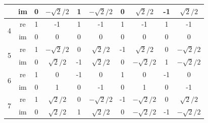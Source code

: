 \begin{center}
\begin{tabular}{| c c c c c c c c c c |}
		                           & im                           & 0                            & $-\sqrt{2}/2$                & 1                            & $-\sqrt{2}/2$                & 0                            & $\sqrt{2}/2$                 & -1                            & $\sqrt{2}/2$  \\
		\hline\hline
		\multirow{2}{*}{4}         & re                           & 1                            & -1                           & 1                            & -1                           & 1                            & -1                           & 1                             & -1            \\
		                           & im                           & 0                            & 0                            & 0                            & 0                            & 0                            & 0                            & 0                             & 0             \\
		\hline\hline
		\multirow{2}{*}{5}         & re                           & 1                            & $-\sqrt{2}/2$                & 0                            & $\sqrt{2}/2$                 & -1                           & $\sqrt{2}/2$                 & 0                             & $-\sqrt{2}/2$ \\
		                           & im                           & 0                            & $\sqrt{2}/2$                 & -1                           & $\sqrt{2}/2$                 & 0                            & $-\sqrt{2}/2$                & 1                             & $-\sqrt{2}/2$ \\
		\hline\hline
		\multirow{2}{*}{6}         & re                           & 1                            & 0                            & -1                           & 0                            & 1                            & 0                            & -1                            & 0             \\
		                           & im                           & 0                            & 1                            & 0                            & -1                           & 0                            & 1                            & 0                             & -1            \\
		\hline\hline
		\multirow{2}{*}{7}         & re                           & 1                            & $\sqrt{2}/2$                 & 0                            & $-\sqrt{2}/2$                & -1                           & $-\sqrt{2}/2$                & 0                             & $\sqrt{2}/2$  \\
		                           & im                           & 0                            & $\sqrt{2}/2$                 & 1                            & $\sqrt{2}/2$                 & 0                            & $-\sqrt{2}/2$                & -1                            & $-\sqrt{2}/2$ \\
		\hline
	\end{tabular}
\end{center}

